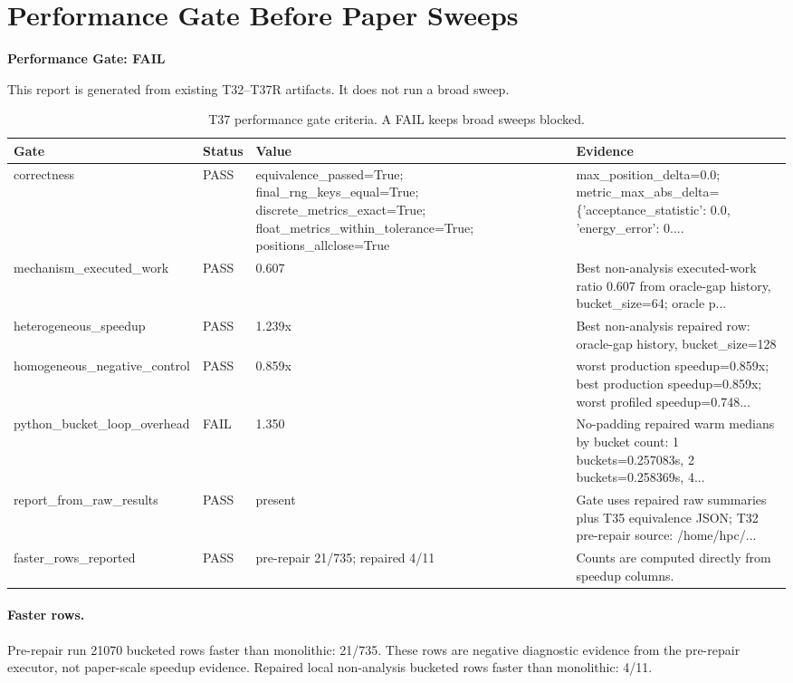 \section*{Performance Gate Before Paper Sweeps}
\textbf{Performance Gate: FAIL}

This report is generated from existing T32--T37R artifacts. It does not run a broad sweep.

\begin{table}[htbp]
\centering
\caption{T37 performance gate criteria. A FAIL keeps broad sweeps blocked.}
\begin{tabular}{llll}
\hline
Gate & Status & Value & Evidence \\
\hline
correctness & PASS & equivalence\_passed=True; final\_rng\_keys\_equal=True; discrete\_metrics\_exact=True; float\_metrics\_within\_tolerance=True; positions\_allclose=True & max\_position\_delta=0.0; metric\_max\_abs\_delta=\{'acceptance\_statistic': 0.0, 'energy\_error': 0.... \\
mechanism\_executed\_work & PASS & 0.607 & Best non-analysis executed-work ratio 0.607 from oracle-gap history, bucket\_size=64; oracle p... \\
heterogeneous\_speedup & PASS & 1.239x & Best non-analysis repaired row: oracle-gap history, bucket\_size=128 \\
homogeneous\_negative\_control & PASS & 0.859x & worst production speedup=0.859x; best production speedup=0.859x; worst profiled speedup=0.748... \\
python\_bucket\_loop\_overhead & FAIL & 1.350 & No-padding repaired warm medians by bucket count: 1 buckets=0.257083s, 2 buckets=0.258369s, 4... \\
report\_from\_raw\_results & PASS & present & Gate uses repaired raw summaries plus T35 equivalence JSON; T32 pre-repair source: /home/hpc/... \\
faster\_rows\_reported & PASS & pre-repair 21/735; repaired 4/11 & Counts are computed directly from speedup columns. \\
\hline
\end{tabular}
\end{table}

\paragraph{Faster rows.}
Pre-repair run 21070 bucketed rows faster than monolithic: 21/735. These rows are negative diagnostic evidence from the pre-repair executor, not paper-scale speedup evidence.
Repaired local non-analysis bucketed rows faster than monolithic: 4/11.

